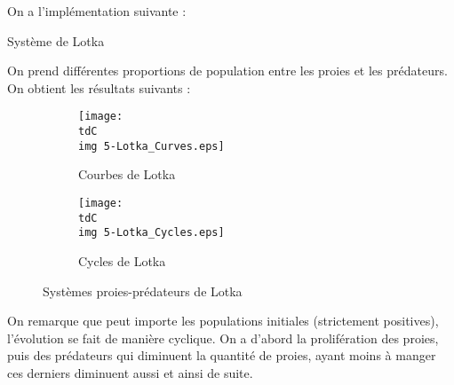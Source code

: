 		On a l'implémentation suivante :
		\begin{listing}[H]
			\caption{Système de Lotka}
			\label{code-3-Lotka}
		\end{listing}

		On prend différentes proportions de population entre les proies et les prédateurs.
		On obtient les résultats suivants :

		\begin{figure}[H]
			\centering
			\begin{subfigure}{.45\linewidth}
				\centering
				\texttt{[image: \\tdC\\img 5-Lotka\_Curves.eps]}
				\caption{Courbes de Lotka}
				\label{img-3-curvesLotka}
			\end{subfigure}
			\begin{subfigure}{.45\linewidth}
				\centering
				\texttt{[image: \\tdC\\img 5-Lotka\_Cycles.eps]}
				\caption{Cycles de Lotka}
				\label{img-3-cyclesLotka}
			\end{subfigure}
			\caption{Systèmes proies-prédateurs de Lotka}
			\label{img-3-Lotka}
		\end{figure}

		On remarque que peut importe les populations initiales (strictement positives), l'évolution se fait de manière cyclique. On a d'abord la prolifération des proies, puis des prédateurs qui diminuent la quantité de proies, ayant moins à manger ces derniers diminuent aussi et ainsi de suite.

